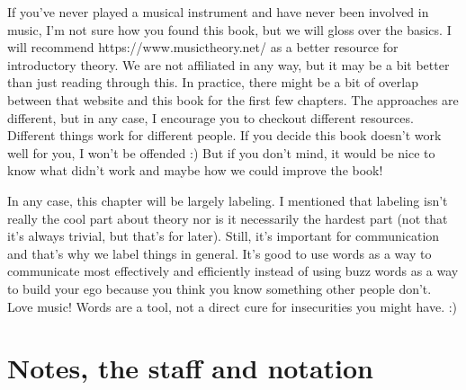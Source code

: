 \documentclass[../OpenAppliedMusicTheory.tex]{subfiles}
\begin{document}
    

    If you've never played a musical instrument and have never been involved in music, I'm not sure how you found this book, but we will gloss over the basics. I will recommend https://www.musictheory.net/ as a better resource for introductory theory. We are not affiliated in any way, but it may be a bit better than just reading through this. In practice, there might be a bit of overlap between that website and this book for the first few chapters. The approaches are different, but in any case, I encourage you to checkout different resources. Different things work for different people. If you decide this book doesn't work well for you, I won't be offended :) But if you don't mind, it would be nice to know what didn't work and maybe how we could improve the book!

    In any case, this chapter will be largely labeling. I mentioned that labeling isn't really the cool part about theory nor is it necessarily the hardest part (not that it's always trivial, but that's for later). Still, it's important for communication and that's why we label things in general. It's good to use words as a way to communicate most effectively and efficiently instead of using buzz words as a way to build your ego because you think you know something other people don't. Love music! Words are a tool, not a direct cure for insecurities you might have. :)

    \section{Notes, the staff and notation}\label{ch.1:notation}
    
\end{document}
